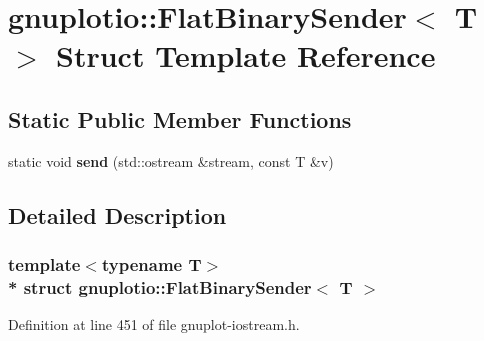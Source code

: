 \hypertarget{structgnuplotio_1_1_flat_binary_sender}{}\section{gnuplotio\+:\+:Flat\+Binary\+Sender$<$ T $>$ Struct Template Reference}
\label{structgnuplotio_1_1_flat_binary_sender}
\subsection*{Static Public Member Functions}
\begin{DoxyCompactItemize}
\item 
static void {\bfseries send} (std\+::ostream \&stream, const T \&v)\hypertarget{structgnuplotio_1_1_flat_binary_sender_a24d085492f2539c14033cd5c6ba75ba5}{}\label{structgnuplotio_1_1_flat_binary_sender_a24d085492f2539c14033cd5c6ba75ba5}

\end{DoxyCompactItemize}


\subsection{Detailed Description}
\subsubsection*{template$<$typename T$>$\\*
struct gnuplotio\+::\+Flat\+Binary\+Sender$<$ T $>$}



Definition at line 451 of file gnuplot-\/iostream.\+h.

